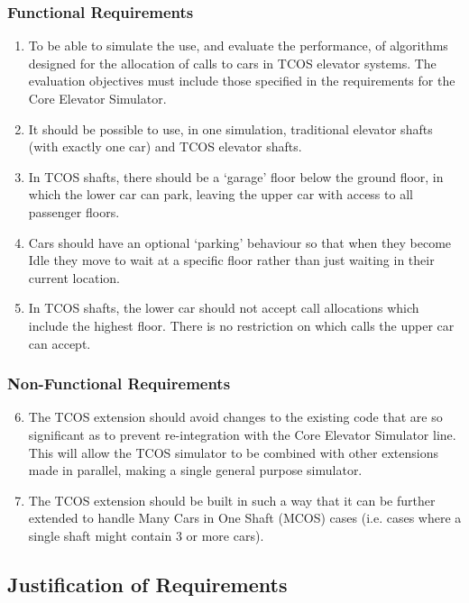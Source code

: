\documentclass{UoYCSproject}
\begin{document}
\subsubsection{Functional Requirements}

	\begin{enumerate}
		\item To be able to simulate the use, and evaluate the performance, of algorithms designed for the allocation of calls to cars in TCOS elevator systems.  The evaluation objectives must include those specified in the requirements for the Core Elevator Simulator.
		\item It should be possible to use, in one simulation, traditional elevator shafts (with exactly one car) and TCOS elevator shafts.
		\item In TCOS shafts, there should be a `garage' floor below the ground floor, in which the lower car can park, leaving the upper car with access to all passenger floors.
		\item Cars should have an optional `parking' behaviour so that when they become Idle they move to wait at a specific floor rather than just waiting in their current location.
		\item In TCOS shafts, the lower car should not accept call allocations which include the highest floor.  There is no restriction on which calls the upper car can accept.
	\end{enumerate}

\subsubsection{Non-Functional Requirements}

	\begin{enumerate}
	\setcounter{enumi}{5}
		\item The TCOS extension should avoid changes to the existing code that are so significant as to prevent re-integration with the Core Elevator Simulator line.  This will allow the TCOS simulator to be combined with other extensions made in parallel, making a single general purpose simulator.
		\item The TCOS extension should be built in such a way that it can be further extended to handle Many Cars in One Shaft (MCOS) cases (i.e. cases where a single shaft might contain 3 or more cars).
	\end{enumerate}

\subsection{Justification of Requirements}
\end{document}
